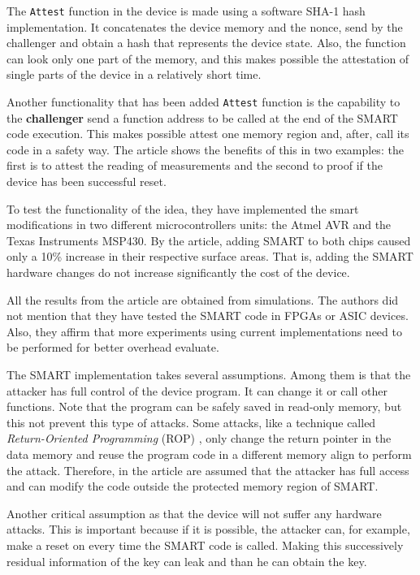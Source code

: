 The \verb|Attest| function in the device is made using a software SHA-1 hash implementation. It concatenates the device memory and the nonce, send by the challenger and obtain a hash that represents the device state. Also, the function can look only one part of the memory, and this makes possible the attestation of single parts of the device in a relatively short time.

Another functionality that has been added \verb|Attest| function is the capability to the \textbf{challenger} send a function address to be called  at the end of the SMART code execution. This makes possible attest one memory region and, after, call its code in a safety way. The article shows the benefits of this in two examples: the first is to attest the reading of measurements and the second to proof if the device has been successful reset. 

To test the functionality of the idea, they have implemented the smart modifications in two different microcontrollers units: the Atmel AVR and the Texas Instruments MSP430. By the article, adding SMART to both chips caused only a 10\% increase in their respective surface areas. That is, adding the SMART hardware changes do not increase significantly the cost of the device.

All the results from the article are obtained from simulations. The authors did not mention that they have tested the SMART code in FPGAs or ASIC devices. Also, they affirm that more experiments using current implementations need to be performed for better overhead evaluate.

The SMART implementation takes several assumptions. Among them is that the attacker has full control of the device program. It can change it or call other functions. Note that the program can be safely saved in read-only memory, but this not prevent this type of attacks. Some attacks, like a technique called \textit{Return-Oriented Programming} (ROP) \cite{rop}, only change the return pointer in the data memory and reuse the program code in a different memory align to perform the attack. Therefore, in the article are assumed that the attacker has full access and can modify the code outside the protected memory region of SMART.

Another critical assumption as that the device will not suffer any hardware attacks. This is important because if it is possible, the attacker can, for example, make a reset on every time the SMART code is called. Making this successively residual information of the key can leak and than he can obtain the key.

